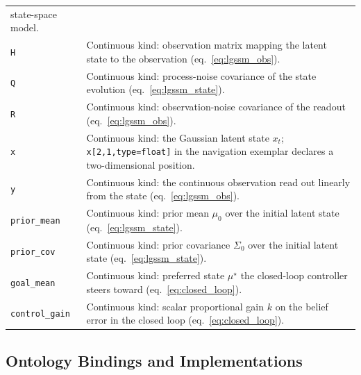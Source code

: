 \documentclass[
  english,
  9pt,
]{extarticle}
\begin{document}
\begin{longtable}[]{@{}
  >{\raggedright\arraybackslash}p{}
  >{\raggedright\arraybackslash}p{}@{}}
state-space model. \\
\texttt{H} & Continuous kind: observation matrix mapping the latent
state to the observation (eq.~\ref{eq:lgssm_obs}). \\
\texttt{Q} & Continuous kind: process-noise covariance of the state
evolution (eq.~\ref{eq:lgssm_state}). \\
\texttt{R} & Continuous kind: observation-noise covariance of the
readout (eq.~\ref{eq:lgssm_obs}). \\
\texttt{x} & Continuous kind: the Gaussian latent state \(x_t\);
\texttt{x{[}2,1,type=float{]}} in the navigation exemplar declares a
two-dimensional position. \\
\texttt{y} & Continuous kind: the continuous observation read out
linearly from the state (eq.~\ref{eq:lgssm_obs}). \\
\texttt{prior\_mean} & Continuous kind: prior mean \(\mu_0\) over the
initial latent state (eq.~\ref{eq:lgssm_state}). \\
\texttt{prior\_cov} & Continuous kind: prior covariance \(\Sigma_0\)
over the initial latent state (eq.~\ref{eq:lgssm_state}). \\
\texttt{goal\_mean} & Continuous kind: preferred state \(\mu^\star\) the
closed-loop controller steers toward (eq.~\ref{eq:closed_loop}). \\
\texttt{control\_gain} & Continuous kind: scalar proportional gain \(k\)
on the belief error in the closed loop (eq.~\ref{eq:closed_loop}). \\
\end{longtable}

\subsection{Ontology Bindings and
Implementations}\label{ontology-bindings-and-implementations}
\end{document}
